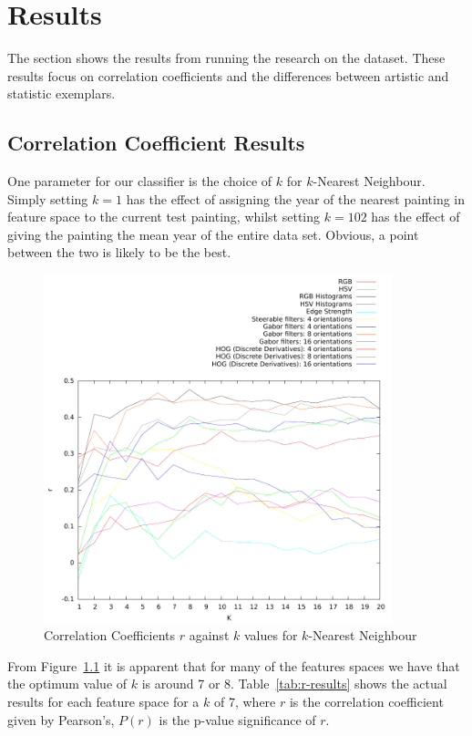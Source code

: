 \chapter{Results}

The section shows the results from running the research on the dataset. These results focus on 
correlation coefficients and the differences between artistic and statistic exemplars.

\section{Correlation Coefficient Results}
One parameter for our classifier is the choice of $k$ for $k$-Nearest Neighbour. Simply setting 
$k=1$ has the effect of assigning the year of the nearest painting in feature space to the current
test painting, whilst setting $k=102$ has the effect of giving the painting the mean year of the 
entire data set. Obvious, a point between the two is likely to be the best. 

\begin{figure}[h]
\centering
\includegraphics[width=0.9\textwidth]{../../isispa-paper/results/mean}
\caption{Correlation Coefficients $r$ against $k$ values for $k$-Nearest Neighbour}\label{fig:r-graph}
\end{figure}

From Figure~\ref{fig:r-graph} it is apparent that for many of the features spaces we have that the 
optimum value of $k$ is around 7 or 8. Table~\ref{tab:r-results} shows the actual results for each 
feature space for a $k$ of 7, where $r$ is the correlation coefficient given by Pearson's, 
$P(r)$ is the p-value significance of $r$.

